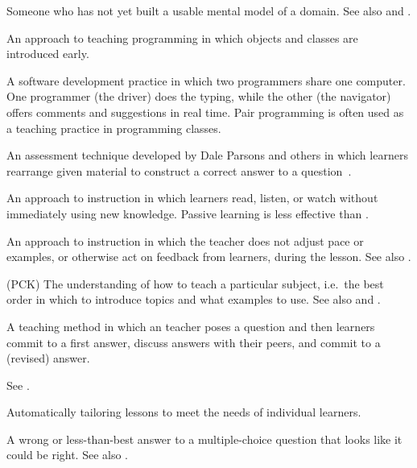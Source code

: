 \begin{description}
 Someone who has not yet built a usable mental model of
a domain. See also 
and .

 An approach to teaching programming in
which objects and classes are introduced early.

 A software development practice in
which two programmers share one computer. One programmer (the driver) does the
typing, while the other (the navigator) offers comments and suggestions in real
time. Pair programming is often used as a teaching practice in programming
classes.

 An assessment technique developed by
Dale Parsons and others in which learners rearrange given material to construct
a correct answer to a question~\cite{Pars2006}.

 An approach to instruction in which
learners read, listen, or watch without immediately using new knowledge.
Passive learning is less effective than .

 An approach to instruction in which
the teacher does not adjust pace or examples, or otherwise act on feedback from
learners, during the lesson.  See also .

 (PCK)
The understanding of how to teach a particular subject, i.e.\ the best order in
which to introduce topics and what examples to use. See also
and .

 A teaching method in which an
teacher poses a question and then learners commit to a first answer, discuss
answers with their peers, and commit to a (revised) answer.

 See .

 Automatically tailoring
lessons to meet the needs of individual learners.

 A wrong or less-than-best
answer to a multiple-choice question that looks like it could be right. See also
.


\end{description}
